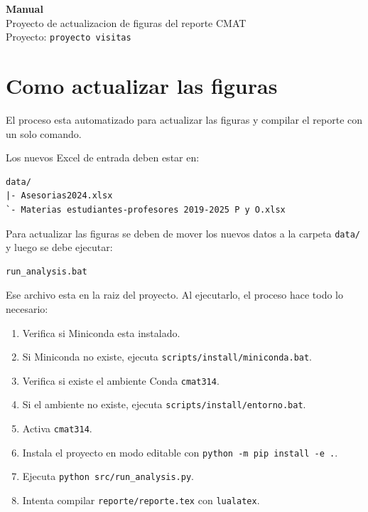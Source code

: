 \documentclass[11pt,letterpaper]{article}
\newcommand{\code}[1]{\texttt{#1}}
\begin{document}
\pagestyle{empty}
\begin{center}
  \vspace*{5cm}
  {\LARGE \textbf{Manual}}\\[0.4em]
  {\large Proyecto de actualizacion de figuras del reporte CMAT}\\[0.8em]
  Proyecto: \code{proyecto visitas}
\end{center}

\tableofcontents
\pagestyle{fancy}
\newpage

\section{Como actualizar las figuras}

El proceso esta automatizado para actualizar las  figuras y compilar el reporte con un solo comando. 

Los nuevos Excel de entrada deben estar en:

\begin{verbatim}
data/
|- Asesorias2024.xlsx
`- Materias estudiantes-profesores 2019-2025 P y O.xlsx
\end{verbatim}


\begin{summary}
Para actualizar las figuras se deben de mover los nuevos datos a la carpeta \code{data/} y luego se debe ejecutar:

\begin{verbatim}
run_analysis.bat
\end{verbatim}
\end{summary}




Ese archivo esta en la raiz del proyecto. Al ejecutarlo, el proceso hace todo lo
necesario:

\begin{enumerate}
  \item Verifica si Miniconda esta instalado.
  \item Si Miniconda no existe, ejecuta \code{scripts/install/miniconda.bat}.
  \item Verifica si existe el ambiente Conda \code{cmat314}.
  \item Si el ambiente no existe, ejecuta \code{scripts/install/entorno.bat}.
  \item Activa \code{cmat314}.
  \item Instala el proyecto en modo editable con \code{python -m pip install -e .}.
  \item Ejecuta \code{python src/run\_analysis.py}.
  \item Intenta compilar \code{reporte/reporte.tex} con \code{lualatex}.
\end{enumerate}
\end{document}

